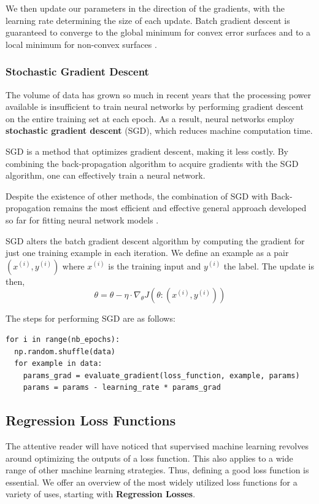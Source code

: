 \documentclass{article}
\begin{document}
   We then update our parameters in the direction of the gradients, with the learning rate determining the size of each update. Batch gradient descent is guaranteed to converge to the global minimum for convex error surfaces and to a local minimum for non-convex surfaces \citep{ruder2017overview}.
\subsubsection{Stochastic Gradient Descent}%
  \label{subsub:Stochastic Gradient Descent}

The volume of data has grown so much in recent years that the processing power available is insufficient to train neural networks by performing gradient descent on the entire training set at each epoch. As a result, neural networks employ \textbf{stochastic gradient descent} (SGD), which reduces machine computation time. 

   SGD is a method that optimizes gradient descent, making it less costly. By combining the back-propagation algorithm to acquire gradients with the SGD algorithm, one can effectively train a neural network.

 Despite the existence of other methods, the combination of SGD with Back-propagation remains the most efficient and effective general approach developed so far for fitting neural network models \citep{SGD-BP}.

   SGD alters the batch gradient descent algorithm by computing the gradient for just one training example in each iteration. We define an example as a pair $(x^{(i)}, y^{(i)})$ where $x^{(i)}$ is the training input and $y^{(i)}$ the label. The update is then,
   $$\theta = \theta - \eta \cdot \nabla_\theta J(\theta :(x^{(i)}, y^{(i)}) ) $$

   The steps for performing SGD are as follows:

\begin{verbatim}
for i in range(nb_epochs): 
  np.random.shuffle(data) 
  for example in data:
    params_grad = evaluate_gradient(loss_function, example, params) 
    params = params - learning_rate * params_grad
\end{verbatim}






\subsection{Regression Loss Functions}%
  \label{sub:Loss Function}
  The attentive reader will have noticed that supervised machine learning revolves around optimizing the outputs of a loss function. This also applies to a wide range of other machine learning strategies. Thus, defining a good loss function is essential. We offer an overview of the most widely utilized loss functions for a variety of uses, starting with \textbf{Regression Losses}.
\end{document}

